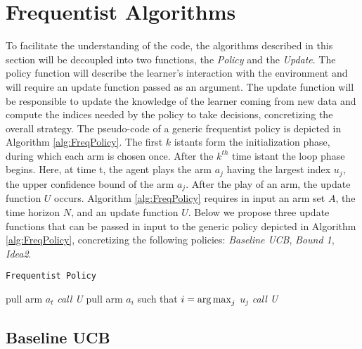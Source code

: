 \section{Frequentist Algorithms}
To facilitate the understanding of the code, the algorithms described in this section will be decoupled into two functions, the \emph{Policy} and the \emph{Update}. The policy function will describe the learner's interaction with the environment and will require an update function passed as an argument. The update function will be responsible to update the knowledge of the learner coming from new data and compute the indices needed by the policy to take decisions, concretizing the overall strategy. The pseudo-code of a generic frequentist policy is depicted in Algorithm \ref{alg:FreqPolicy}.  The first $k$ istants form the initialization phase, during which  each arm is chosen once. After the $k^{th}$ time istant the loop phase begins. Here, at time t, the agent plays the arm $a_j$ having the largest index $u_j$, the upper confidence bound of the arm $a_j$. After the play of an arm, the update function $U$ occurs.
Algorithm \ref{alg:FreqPolicy} requires in input an arm set $A$, the time horizon $N$, and an update function $U$. Below we propose three update functions that can be passed in input to the generic policy depicted in Algorithm \ref{alg:FreqPolicy}, concretizing the following policies: \emph{Baseline UCB}, \emph{Bound 1}, \emph{Idea2}.

\begin{algorithm}[H]
	\caption{\texttt{Frequentist Policy}}
	\begin{scriptsize}
		\begin{algorithmic}[1]						
			 
			\State pull arm $a_t$\;
			\State \emph{call U}\;
			\EndFor
			 
			\State pull arm $a_i$ such that  $i = \operatorname*{arg\,max}_j$ $u_j $\;
			\State \emph{call U}\;
			\EndFor
			\EndFunction			
		\end{algorithmic}
	\end{scriptsize}
	\label{alg:FreqPolicy}
\end{algorithm}



\subsection{Baseline UCB}

